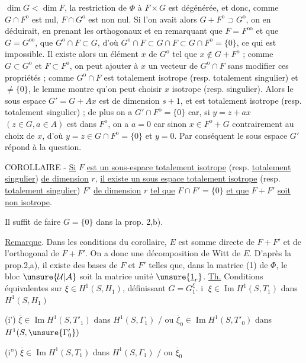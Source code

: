 $\dim G<\dim F$, la restriction de $\Phi$ à $F\times G$ est dégénérée, et donc, comme $G\cap F^{\mathrm o}$ est nul, $F\cap G^{\mathrm o}$ est non nul. Si l'on avait alors $G+F^{\mathrm o}\supset G^{\mathrm o}$, on en déduirait, en prenant les orthogonaux et en remarquant que $F=F^{\mathrm{oo}}$ et que $G=G^{\mathrm{oo}}$, que $G^{\mathrm o}\cap F\subset G$, d'où $G^{\mathrm o}\cap F\subset G\cap F\subset G\cap F^{\mathrm o}=\{0\}$, ce qui est impossible. Il existe alors un élément $x$ de $G^{\mathrm o}$ tel que $x\notin G+F^{\mathrm o}$ ; comme $G\subset G^{\mathrm o}$ et $F\subset F^{\mathrm o}$, on peut ajouter à $x$ un vecteur de $G^{\mathrm o}\cap F$ sans modifier ces propriétés ; comme $G^{\mathrm o}\cap F$ est totalement isotrope (resp. totalement singulier) et $\ne\{0\}$, le lemme montre qu'on peut choisir $x$ isotrope (resp. singulier). Alors le sous espace $G'=G+Ax$ est de dimension $s+1$, et est totalement isotrope (resp. totalement singulier) ; de plus on a $G'\cap F^{\mathrm o}=\{0\}$ car, si $y=z+ax$ $(z\in G,a\in A)$ est dans $F^{\mathrm o}$, on a $a=0$ car sinon $x\in F^{\mathrm o}+G$ contrairement au choix de $x$, d'où $y=z\in G\cap F^{\mathrm o}=\{0\}$ et $y=0$. Par conséquent le sous espace $G'$ répond à la question.

COROLLAIRE - \uline{Si} $F$ \uline{est un sous-espace totalement isotrope} (resp. \uline{totalement singulier}) \uline{de dimension} $r$, \uline{il existe un sous espace totalement isotrope} (resp. \uline{totalement singulier}) $F'$ \uline{de dimension} $r$ \uline{tel que} $F\cap F'=\{0\}$ \uline{et que} $F+F'$ \uline{soit non isotrope}.

Il suffit de faire $G=\{0\}$ dans la prop. 2,b).

\uline{Remarque}. Dans les conditions du corollaire, $E$ est somme directe de $F+F'$ et de l'orthogonal de $F+F'$. On a donc une décomposition de Witt de $E$. D'après la prop.2,a), il existe des bases de $F$ et $F'$ telles que, dans la matrice (1) de $\Phi$, le bloc $\unsure{\mathcal U|\mathcal A}$ soit la matrice unité $\unsure{\underline{1}_r}$.
\uline{Th.} Conditions équivalentes sur $\xi\in H^1(S,H_1)$, définissant $G=G_1^\xi$.
\textcircled{i}  $\xi\in\operatorname{Im}H^1(S,T_1)$ dans $H^1(S,H_1)$

(i') $\overline\xi\in\operatorname{Im}H^1(S,T'_1)$ dans $H^1(S,\Gamma_1)$ / ou $\overline\xi_0\in\operatorname{Im}H^1(S,T'_0)$ dans $H^1(S,\unsure{\Gamma'_0})$

(i'') $\overline\xi\in\operatorname{Im}H^1(S,T_1)$ dans $H^1(S,\Gamma_1)$ / ou $\overline\xi_0$

